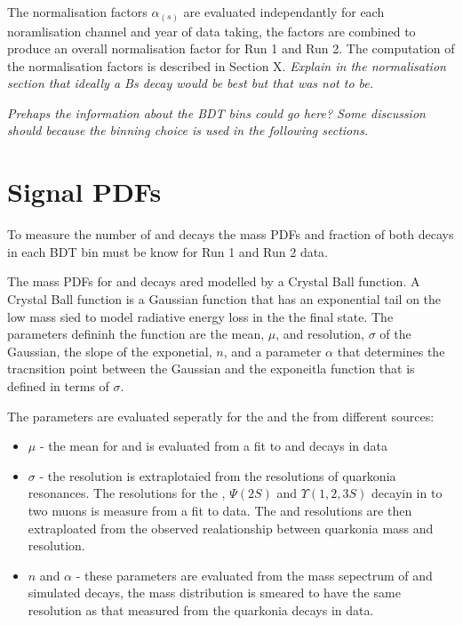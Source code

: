 The normalisation factors $\alpha_{(s)}$ are evaluated independantly for each noramlisation channel and year of data taking, the factors are combined to produce an overall normalisation factor for Run 1 and Run 2. The computation of the normalisation factors is described in Section X. 
{\it Explain in the normalisation section that ideally a Bs decay would be best but that was not to be.}

{\it Prehaps the information about the BDT bins could go here? Some discussion should because the binning choice is used in the following sections.}

\section{Signal PDFs}
\label{sec:signalPdfs}

To measure the number of \bdmumu and \bsmumu decays the mass PDFs and fraction of both decays in each BDT bin must be know for Run 1 and Run 2 data.

The mass PDFs for \bdmumu and \bsmumu decays ared modelled by a Crystal Ball function. A Crystal Ball function is a Gaussian function that has an exponential tail on the low mass sied to model radiative energy loss in the the final state. The parameters defininh the function are the mean, $\mu$, and resolution, $\sigma$ of the Gaussian, the slope of the exponetial, $n$, and a parameter $\alpha$ that determines the tracnsition point between the Gaussian and the exponeitla function that is defined in terms of $\sigma$. 

The parameters are evaluated seperatly for the \bs and the \bd from different sources:
\begin{itemize}
\item $\mu$ - the mean for \bs and \bd is evaluated from a fit to \bskk and \bdkpi decays in data
\item $\sigma$ - the resolution is extraplotaied from the resolutions of quarkonia resonances. The resolutions for the \jpsi, $\Psi (2S)$ and $\Upsilon(1, 2, 3S)$ decayin in to two muons is measure from a fit to data. The \bs and \bd resolutions are then extraploated from the observed realationship between quarkonia mass and resolution.
\item $n$ and $\alpha$ - these parameters are evaluated from the mass sepectrum of \bsmumu and \bdmumu simulated decays, the mass distribution is smeared to have the same resolution as that measured from the quarkonia decays in data.
\end{itemize}

